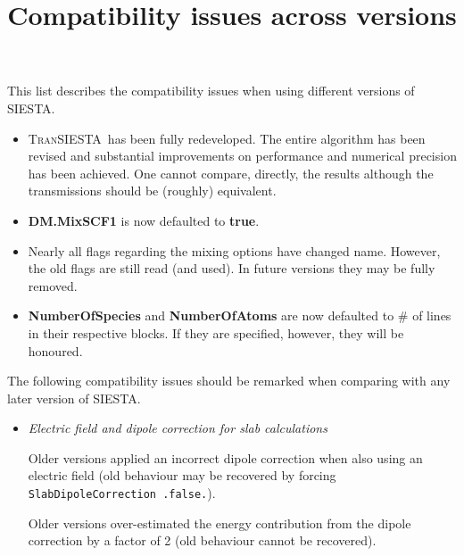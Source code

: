 \documentclass{article}
\title{Compatibility issues across versions}
\author{\siesta}
\newcommand\siesta{\textsc{SIESTA}}
\newcommand\tsiesta{\textsc{TranSIESTA}}
\newcommand{\fdf}[1]{\textbf{#1}}
\newcommand{\code}[1]{\texttt{#1}}
\begin{document}
\maketitle

\clearpage

This list describes the compatibility issues when using different versions of \siesta.

\begin{description}
  \setlength\itemsep{1pt}
  \setlength\topsep{1pt}

  \item[4.1]%
  \begin{itemize}
    \item %
    \tsiesta\ has been fully redeveloped. The entire algorithm has been revised and
    substantial improvements on performance and numerical precision has been achieved. One
    cannot compare, directly, the results although the transmissions should be (roughly)
    equivalent.

    \item %
    \fdf{DM.MixSCF1} is now defaulted to \fdf{true}.

    \item %
    Nearly all flags regarding the mixing options have changed name. However, the old
    flags are still read (and used). In future versions they may be fully removed.

    \item \fdf{NumberOfSpecies} and \fdf{NumberOfAtoms} are now defaulted to \# of lines
    in their respective blocks. If they are specified, however, they will be honoured.

  \end{itemize}
  

  \item[0 --- 4.0-b2] The following compatibility issues should be remarked when
  comparing with any later version of \siesta.

  \begin{itemize}
    \item \emph{Electric field and dipole correction for slab calculations}

    Older versions applied an incorrect dipole correction when also using an
    electric field (old behaviour may be recovered by forcing \code{SlabDipoleCorrection .false.}). 

    Older versions over-estimated the energy contribution from the dipole correction by a
    factor of 2 (old behaviour cannot be recovered).


\end{itemize}
\end{description}
\end{document}
